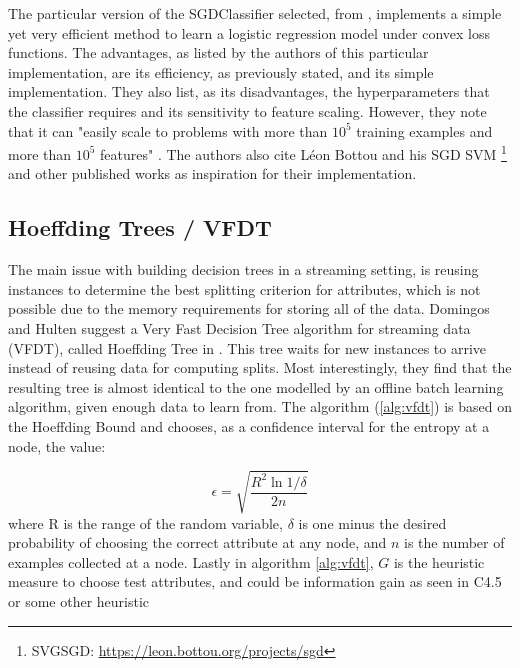 The particular version of the SGDClassifier selected, from \cite{scikit-learn}, implements a simple yet very efficient method to learn a logistic regression model under convex loss functions. The advantages, as listed by the authors of this particular implementation, are its efficiency, as previously stated, and its simple implementation. They also list, as its disadvantages, the hyperparameters that the classifier requires and its sensitivity to feature scaling. However, they note that it can "easily scale to problems with more than $10^5$ training examples and more than $10^5$ features" \cite{scikit-learn-sgd}. The authors also cite Léon Bottou and his SGD SVM \cite{bottou2008learning}\footnote{SVGSGD: \url{https://leon.bottou.org/projects/sgd}} and other published works \cite{tsuruoka2009stochastic, shalev2011pegasos} as inspiration for their implementation.

\subsection{Hoeffding Trees / VFDT}
The main issue with building decision trees in a streaming setting, is reusing instances to determine the best splitting criterion for attributes, which is not possible due to the memory requirements for storing all of the data. Domingos and Hulten suggest a Very Fast Decision Tree algorithm for streaming data (VFDT), called Hoeffding Tree in \cite{domingos2000mining}. This tree waits for new instances to arrive instead of reusing data for computing splits. Most interestingly, they find that the resulting tree is almost identical to the one modelled by an offline batch learning algorithm, given enough data to learn from. The algorithm (\ref{alg:vfdt}) is based on the Hoeffding Bound and chooses, as a confidence interval for the entropy at a node, the value:

\begin{equation}
\epsilon=\sqrt{\frac{R^{2} \ln 1 / \delta}{2 n}}
\end{equation}
where R is the range of the random variable, $\delta$ is one minus the desired probability of choosing the correct attribute at any node, and $n$ is the number of examples collected at a node. Lastly in algorithm \ref{alg:vfdt}, $G$ is the heuristic measure to choose test attributes, and could be information gain as seen in C4.5 or some other heuristic \cite{bifet2018machine, domingos2000mining, }

